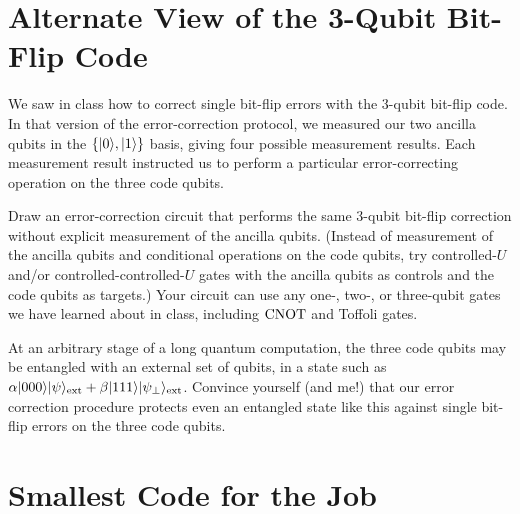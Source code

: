 \documentclass{../phys084}
\author{}
\date{2020 March 11}
\begin{document}
\section{Alternate View of the 3-Qubit Bit-Flip Code}

\begin{exercise}
  We saw in class how to correct single bit-flip errors with the 3-qubit
  bit-flip code.  In that version of the error-correction protocol, we
  measured our two ancilla qubits in the \(\{\lvert0\rangle, \lvert1\rangle\}\) basis,
  giving four possible measurement results.  Each measurement result
  instructed us to perform a particular error-correcting operation on
  the three code qubits.
  \begin{problems}
  \item Draw an error-correction circuit that performs the same 3-qubit
    bit-flip correction without explicit measurement of the ancilla
    qubits.  (Instead of measurement of the ancilla qubits and
    conditional operations on the code qubits, try controlled-\(U\)
    and/or controlled-controlled-\(U\) gates with the ancilla qubits as
    controls and the code qubits as targets.)  Your circuit can use any
    one-, two-, or three-qubit gates we have learned about in class,
    including \(\operatorname{CNOT}\) and Toffoli gates.
  \item At an arbitrary stage of a long quantum computation, the three
    code qubits may be entangled with an external set of qubits, in a
    state such as
    \(\alpha \lvert000\rangle \lvert\psi\rangle_\text{ext} +
    \beta\lvert111\rangle\lvert\psi_{\perp}\rangle_\text{ext}\).  Convince yourself
    (and me!)  that our error correction procedure protects even an
    entangled state like this against single bit-flip errors on the
    three code qubits.
  \end{problems}
\end{exercise}

\begin{solution}
  \begin{problems}
  \item
  \item
  \end{problems}
\end{solution}

\section{Smallest Code for the Job}
\end{document}
